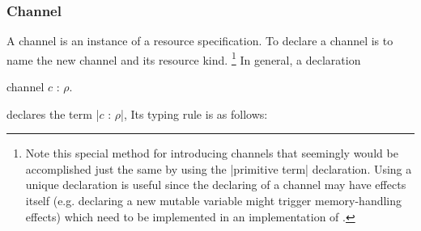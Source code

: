 %
%
%

\subsubsection{Channel}

A channel is an instance of a resource specification.
To declare a channel is to name the new channel and its resource kind.%
\footnote{
  Note this special method for introducing channels that seemingly would be accomplished just the same by using the \code|primitive term| declaration.
  Using a unique declaration is useful since the declaring of a channel may have effects itself (e.g. declaring a new mutable variable might trigger memory-handling effects) which need to be implemented in an implementation of \LangD.
}
In general, a declaration
\begin{snippet}
channel $c$ : $ρ$.
\end{snippet}
declares the term \code|$c$ : $ρ$|,
Its typing rule is as follows:



